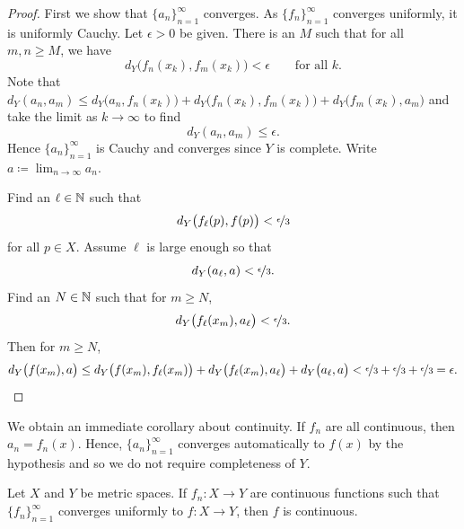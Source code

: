\begin{proof}
First we show that $\{ a_n \}_{n=1}^\infty$ converges.  As
$\{ f_n \}_{n=1}^\infty$ converges uniformly, it is uniformly Cauchy. 
Let $\epsilon > 0$ be given.  There is
an $M$ such that for all $m,n \geq M$, we have
\begin{equation*}
d_Y\bigl(f_n(x_k),f_m(x_k)\bigr) < \epsilon \qquad \text{for all } k .
\end{equation*}
Note that
$d_Y(a_n,a_m) \leq
d_Y\bigl(a_n,f_n(x_k)\bigr) +
d_Y\bigl(f_n(x_k),f_m(x_k)\bigr) +
d_Y\bigl(f_m(x_k),a_m\bigr)$ and take the limit as $k \to \infty$ to find
\begin{equation*}
d_Y(a_n,a_m) \leq \epsilon .
\end{equation*}
Hence $\{a_n\}_{n=1}^\infty$ is Cauchy and converges since $Y$ is complete.  Write
$a \coloneqq \lim_{n \to \infty} a_n$.

Find an $\ell \in {\mathbb{N}}$ such that
\begin{equation*}
d_Y\bigl(f_\ell(p),f(p)\bigr) < \nicefrac{\epsilon}{3}
\end{equation*}
for all $p \in X$.  Assume $\ell$ is large enough
so that
\begin{equation*}
d_Y(a_\ell,a) < \nicefrac{\epsilon}{3}  .
\end{equation*}
Find an $N \in {\mathbb{N}}$ such that for $m \geq N$,
\begin{equation*}
d_Y\bigl(f_\ell(x_m),a_\ell\bigr) < \nicefrac{\epsilon}{3}  .
\end{equation*}
Then for
$m \geq N$,
\begin{equation*}
d_Y\bigl(f(x_m),a\bigr)
\leq
d_Y\bigl(f(x_m),f_\ell(x_m)\bigr)
+
d_Y\bigl(f_\ell(x_m),a_\ell\bigr)
+
d_Y\bigl(a_\ell,a\bigr)
<
\nicefrac{\epsilon}{3} +
\nicefrac{\epsilon}{3} +
\nicefrac{\epsilon}{3} = \epsilon . \qedhere
\end{equation*}
\end{proof}

We obtain an immediate corollary about continuity.
If $f_n$ are all continuous, then $a_n = f_n(x)$.
Hence,
$\{ a_n \}_{n=1}^\infty$ converges automatically to
$f(x)$ by the hypothesis and so we do not require completeness of $Y$.

\begin{cor} \label{cor:metricuniformcontinuous}
Let $X$ and $Y$ be metric spaces.
If $f_n \colon X \to Y$ are continuous functions
such that
$\{ f_n \}_{n=1}^\infty$ converges uniformly to $f \colon X \to Y$,
then $f$ is continuous.
\end{cor}

